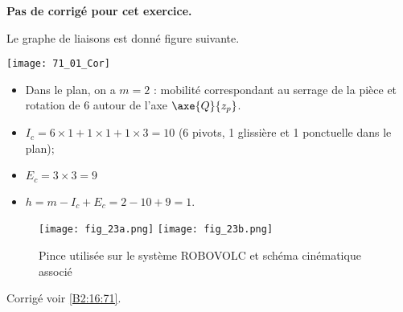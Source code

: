 \normaltrue \difficilefalse \tdifficilefalse
\correctiontrue

\exer{ $\star$ \label{B2:16:71}}
\setcounter{numques}{0}


\ifcorrection
\else
\textbf{Pas de corrigé pour cet exercice.}
\fi


\ifprof
Le graphe de liaisons est donné figure suivante. 

\begin{center}
\texttt{[image: 71\_01\_Cor]}
\end{center}
\begin{itemize}
\item Dans le plan, on a $m=2$ : mobilité correspondant au serrage de la pièce et rotation de 6 autour de l'axe $\axe{Q}{z_p}$.
\item $I_c = 6\times 1 + 1 \times 1 + 1 \times 3 = 10$ (6 pivots, 1 glissière et 1 ponctuelle dans le plan);
\item $E_c = 3 \times 3 = 9$
\item $h=m-I_c+E_c = 2-10+9 = 1$. 
\end{itemize}
\else
\fi

\ifprof
\else
\begin{figure}[H]
\centering
\texttt{[image: fig\_23a.png]}
\texttt{[image: fig\_23b.png]}
\caption{Pince utilisée sur le système ROBOVOLC et schéma cinématique associé \label{fig_23}}
\end{figure} 
\fi 

\ifprof
\else

\noindent\footnotesize
\normalsize

\begin{flushright}
\footnotesize{Corrigé  voir \ref{B2:16:71}.}
\end{flushright}%
\fi